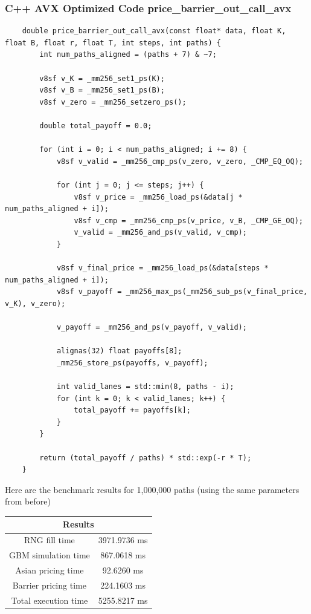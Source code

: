 \documentclass{article}
\begin{document}
\subsubsection*{C++ AVX Optimized Code price\_barrier\_out\_call\_avx}
\begin{lstlisting}
    double price_barrier_out_call_avx(const float* data, float K, float B, float r, float T, int steps, int paths) {
        int num_paths_aligned = (paths + 7) & ~7;
        
        v8sf v_K = _mm256_set1_ps(K);
        v8sf v_B = _mm256_set1_ps(B);
        v8sf v_zero = _mm256_setzero_ps();

        double total_payoff = 0.0;

        for (int i = 0; i < num_paths_aligned; i += 8) {
            v8sf v_valid = _mm256_cmp_ps(v_zero, v_zero, _CMP_EQ_OQ);

            for (int j = 0; j <= steps; j++) {
                v8sf v_price = _mm256_load_ps(&data[j * num_paths_aligned + i]);
                v8sf v_cmp = _mm256_cmp_ps(v_price, v_B, _CMP_GE_OQ);
                v_valid = _mm256_and_ps(v_valid, v_cmp);
            }

            v8sf v_final_price = _mm256_load_ps(&data[steps * num_paths_aligned + i]);
            v8sf v_payoff = _mm256_max_ps(_mm256_sub_ps(v_final_price, v_K), v_zero);

            v_payoff = _mm256_and_ps(v_payoff, v_valid);

            alignas(32) float payoffs[8];
            _mm256_store_ps(payoffs, v_payoff);

            int valid_lanes = std::min(8, paths - i);
            for (int k = 0; k < valid_lanes; k++) {
                total_payoff += payoffs[k];
            }
        }

        return (total_payoff / paths) * std::exp(-r * T);
    }
\end{lstlisting}

Here are the benchmark results for 1,000,000 paths (using the same parameters from before)
\begin{center}
    \begin{tabular}{|c|c|}
        \hline
        \multicolumn{2}{|c|}{Results} \\
        \hline
        RNG fill time & 3971.9736 ms \\
        \hline
        GBM simulation time & 867.0618 ms\\
        \hline
        Asian pricing time & 92.6260 ms \\
        \hline
        Barrier pricing time & 224.1603 ms \\
        \hline
        Total execution time & 5255.8217 ms \\
        \hline
    \end{tabular}
\end{center}
\end{document}

